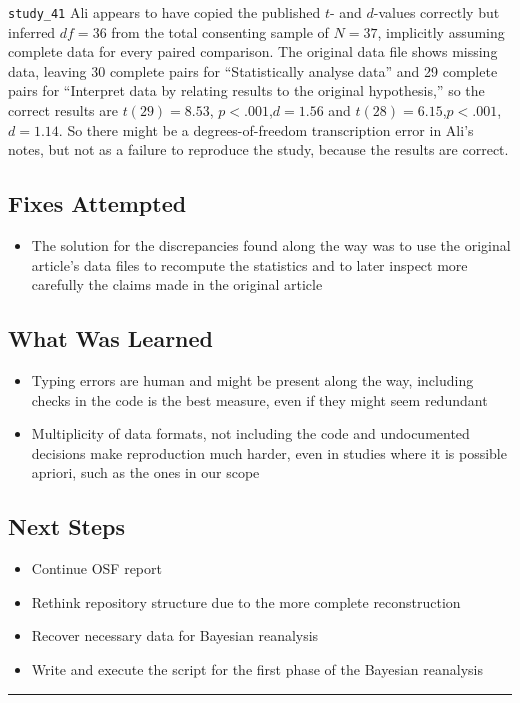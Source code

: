 \documentclass[11pt,a4paper]{article}
\newcommand{\entryseparator}{
  \vspace{1em} \noindent\rule{\textwidth}{0.4pt}
  \vspace*{-\baselineskip} 
}
\begin{document}
\begin{itemize}
\texttt{study_41} Ali appears to have copied the published $t$- and $d$-values correctly but inferred $df=36$ from the total consenting sample of $N=37$, implicitly assuming complete data for every paired comparison. The original data file shows missing data, leaving 30 complete pairs for “Statistically analyse data” and 29 complete pairs for “Interpret data by relating results to the original hypothesis,” so the correct results are $t(29)=8.53$, $p<.001$,$d=1.56$ and $t(28)=6.15$,$p<.001$,$d=1.14$. So there might be a degrees-of-freedom transcription error in Ali’s notes, but not as a failure to reproduce the study, because the results are correct.



\end{itemize}

\subsection{Fixes Attempted}

\begin{itemize}
    \item The solution for the discrepancies found along the way was to use the original article's data files to recompute the statistics and to later inspect more carefully the claims made in the original article

\end{itemize}

\subsection{What Was Learned}

\begin{itemize}
    \item Typing errors are human and might be present along the way, including checks in the code is the best measure, even if they might seem redundant 
    \item Multiplicity of data formats, not including the code and undocumented decisions make reproduction much harder, even in studies where it is possible apriori, such as the ones in our scope
\end{itemize}

\subsection{Next Steps}

\begin{itemize}
    \item Continue OSF report
    \item Rethink repository structure due to the more complete reconstruction
    \item Recover necessary data for Bayesian reanalysis
    \item Write and execute the script for the first phase of the Bayesian reanalysis 
\end{itemize}
\entryseparator
\end{document}
